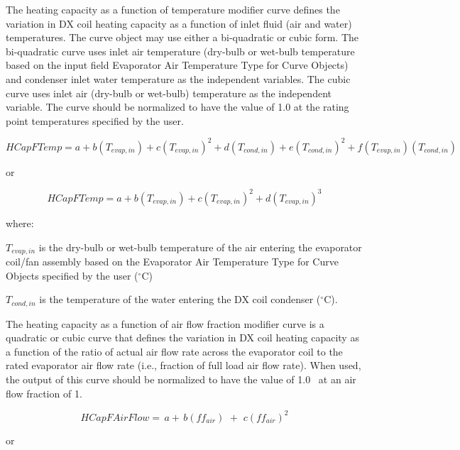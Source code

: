 The heating capacity as a function of temperature modifier curve defines the variation in DX coil heating capacity as a function of inlet fluid (air and water) temperatures. The curve object may use either a bi-quadratic or cubic form. The bi-quadratic curve uses inlet air temperature (dry-bulb or wet-bulb temperature based on the input field Evaporator Air Temperature Type for Curve Objects) and condenser inlet water temperature as the independent variables. The cubic curve uses inlet air (dry-bulb or wet-bulb) temperature as the independent variable. The curve should be normalized to have the value of 1.0 at the rating point temperatures specified by the user.

\begin{equation}
HCapFTemp = a + b\left( {{T_{evap,in}}} \right) + c{\left( {{T_{evap,in}}} \right)^2} + d\left( {{T_{cond,in}}} \right) + e{\left( {{T_{cond,in}}} \right)^2} + f\left( {{T_{evap,in}}} \right)\left( {{T_{cond,in}}} \right)
\end{equation}

or

\begin{equation}
HCapFTemp = a + b\left( {{T_{evap,in}}} \right) + c{\left( {{T_{evap,in}}} \right)^2} + d{\left( {{T_{evap,in}}} \right)^3}
\end{equation}

where:

\({T_{evap,in}}\) is the dry-bulb or wet-bulb temperature of the air entering the evaporator coil/fan assembly based on the Evaporator Air Temperature Type for Curve Objects specified by the user (\(^{\circ}\)C)

\({T_{cond,in}}\) is the temperature of the water entering the DX coil condenser (\(^{\circ}\)C).

The heating capacity as a function of air flow fraction modifier curve is a quadratic or cubic curve that defines the variation in DX coil heating capacity as a function of the ratio of actual air flow rate across the evaporator coil to the rated evaporator air flow rate (i.e., fraction of full load air flow rate). When used, the output of this curve should be normalized to have the value of 1.0~ at an air flow fraction of 1.

\begin{equation}
HCapFAirFlow = \,a + \,b\left( {f{f_{air}}} \right)\,\, + \,\,c{\left( {f{f_{air}}} \right)^2}
\end{equation}

or

